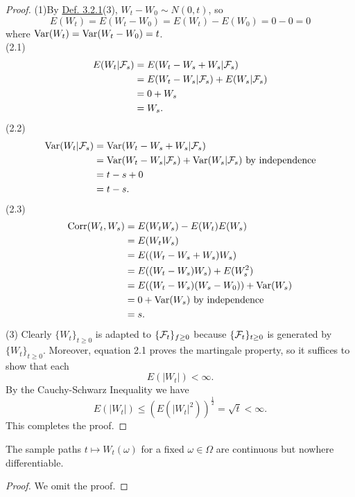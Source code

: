 \documentclass[11pt,fleqn]{book} %
\begin{document}
\begin{proof}
(1)By \hyperref[def:321]{Def. 3.2.1}(3), \(W_t - W_0 \sim N(0, t)\), so
\[
E(W_t) = E(W_t - W_0) = E(W_t) - E(W_0) = 0 - 0 = 0
\]
where \(\operatorname{Var}(W_t) = \operatorname{Var}(W_t - W_0) = t\). \\
(2.1) \[
\begin{aligned}
E(W_t|\mathcal{F}_s) &= E(W_t - W_s + W_s | \mathcal{F}_s) \\
&= E(W_t - W_s|\mathcal{F}_s) + E(W_s|\mathcal{F}_s) \\
&= 0 + W_s \\
&= W_s.
\end{aligned}
\]
(2.2) \[
\begin{aligned}
\operatorname{Var}(W_t|\mathcal{F}_s) &= \operatorname{Var}(W_t - W_s + W_s|\mathcal{F}_s) \\
&= \operatorname{Var}(W_t - W_s | \mathcal{F}_s) + \operatorname{Var}(W_s|\mathcal{F}_s) \text{ by independence} \\
&= t - s + 0 \\
&= t - s.
\end{aligned}
\]
(2.3) \[
\begin{aligned}
\operatorname{Corr}(W_t, W_s) &= E(W_tW_s) - E(W_t)E(W_s) \\
&= E(W_tW_s) \\
&= E((W_t - W_s + W_s)W_s) \\
&= E((W_t - W_s)W_s) + E(W_s^2) \\
&= E((W_t - W_s)(W_s - W_0)) + \operatorname{Var}(W_s) \\
&= 0 + \operatorname{Var}(W_s) \text{ by independence} \\
&= s.
\end{aligned}
\]
(3) Clearly \(\{W_t\}_{t\geq0}\) is adapted to \(\{\mathcal{F}_t\}_{f\geq0}\) because \(\{\mathcal{F}_t\}_{t\geq0}\) is generated by \(\{W_t\}_{t\geq0}\). Moreover, equation 2.1 proves the martingale property, so it suffices to show that each
\[
E(|W_t|) < \infty.
\]
\indent By the Cauchy-Schwarz Inequality we have
\[
E(|W_t|) \leq \left(E(|W_t|^2)\right)^{\frac12} = \sqrt{t} < \infty.
\]
\indent This completes the proof.
\end{proof}

\begin{proposition} \label{prop:3213}
The sample paths \(t\mapsto W_t(\omega)\) for a fixed \(\omega \in \Omega\) are continuous but nowhere differentiable.
\end{proposition}
\begin{proof} We omit the proof.\end{proof}
\end{document}
